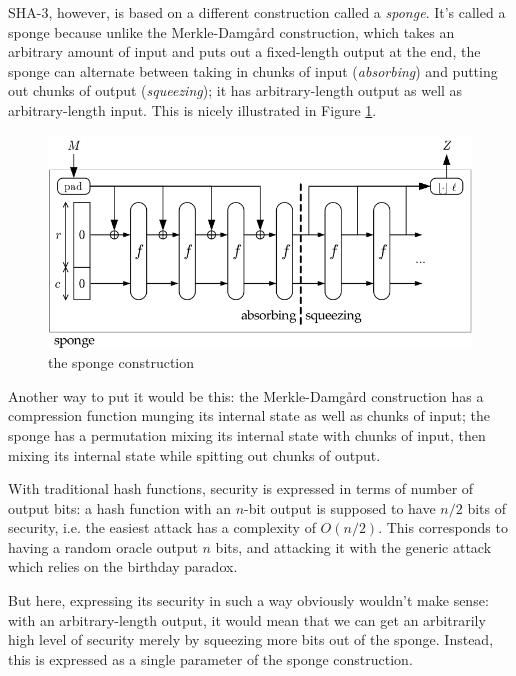 \documentclass[times, utf8, diplomski]{fer}
\begin{document}
SHA-3, however, is based on a different construction called a \emph{sponge}.
It's called a sponge because unlike the Merkle-Damgård construction, which takes
an arbitrary amount of input and puts out a fixed-length output at the end, the
sponge can alternate between taking in chunks of input (\emph{absorbing}) and
putting out chunks of output (\emph{squeezing}); it has arbitrary-length output
as well as arbitrary-length input.
This is nicely illustrated in Figure \ref{fig:sponge}.


\begin{figure}[htb]
    \centering
    \includegraphics{images/sponge.png}
    \caption{the sponge construction}
    \label{fig:sponge}
\end{figure}

Another way to put it would be this: the Merkle-Damgård construction has a
compression function munging its internal state as well as chunks of input;
the sponge has a permutation mixing its internal state with chunks of input,
then mixing its internal state while spitting out chunks of output.

With traditional hash functions, security is expressed in terms of number of
output bits: a hash function with an $n$-bit output is supposed to have $n/2$
bits of security, i.e. the easiest attack has a complexity of $O(n/2)$.
This corresponds to having a random oracle output $n$ bits, and attacking it
with the generic attack which relies on the birthday paradox.

But here, expressing its security in such a way obviously wouldn't make sense:
with an arbitrary-length output, it would mean that we can get an arbitrarily
high level of security merely by squeezing more bits out of the sponge.
Instead, this is expressed as a single parameter of the sponge construction.
\end{document}
